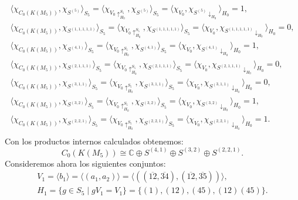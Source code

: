 \documentclass[12pt]{book}
\theoremstyle{definition}
\newcounter{in}
\begin{document}
\begin{eqnarray*}
  \langle\chi_{C_{0}(K(M_{5}))},\chi_{S^{(5)}}\rangle_{S_{5}}=\langle\chi_{V_{0}\uparrow^{S_{5}}_{H_0}},\chi_{S^{(5)}}\rangle_{S_{5}}=\langle\chi_{V_{0}},\chi_{S^{(5)}\downarrow_{H_{0}}}\rangle_{H_{0}}=1,\\
 \langle\chi_{C_{0}(K(M_{5}))},\chi_{S^{(1,1,1,1,1)}}\rangle_{S_{5}}=\langle\chi_{V_{0}\uparrow^{S_{5}}_{H_0}},\chi_{S^{(1,1,1,1,1)}}\rangle_{S_{5}}=\langle\chi_{V_{0}},\chi_{S^{(1,1,1,1,1)}\downarrow_{H_{0}}}\rangle_{H_{0}}=0,\\
\langle\chi_{C_{0}(K(M_{5}))},\chi_{S^{(4,1)}}\rangle_{S_{5}}=\langle\chi_{V_{0}\uparrow^{S_{5}}_{H_0}},\chi_{S^{(4,1)}}\rangle_{S_{5}}=\langle\chi_{V_{0}},\chi_{S^{(4,1)}\downarrow_{H_{0}}}\rangle_{H_{0}}=1,\\
\langle\chi_{C_{0}(K(M_{5}))},\chi_{S^{(2,1,1,1)}}\rangle_{S_{5}}=\langle\chi_{V_{0}\uparrow^{S_{5}}_{H_0}},\chi_{S^{(2,1,1,1)}}\rangle_{S_{5}}=\langle\chi_{V_{0}},\chi_{S^{(2,1,1,1)}\downarrow_{H_{0}}}\rangle_{H_{0}}=0,\\
\langle\chi_{C_{0}(K(M_{5}))},\chi_{S^{(3,1,1)}}\rangle_{S_{5}}=\langle\chi_{V_{0}\uparrow^{S_{5}}_{H_0}},\chi_{S^{(3,1,1)}}\rangle_{S_{5}}=\langle\chi_{V_{0}},\chi_{S^{(3,1,1)}\downarrow_{H_{0}}}\rangle_{H_{0}}=0,\\
\langle\chi_{C_{0}(K(M_{5}))},\chi_{S^{(3,2)}}\rangle_{S_{5}}=\langle\chi_{V_{0}\uparrow^{S_{5}}_{H_0}},\chi_{S^{(3,2)}}\rangle_{S_{5}}=\langle\chi_{V_{0}},\chi_{S^{(3,2)}\downarrow_{H_{0}}}\rangle_{H_{0}}=1,\\
\langle\chi_{C_{0}(K(M_{5}))},\chi_{S^{(2,2,1)}}\rangle_{S_{5}}=\langle\chi_{V_{0}\uparrow^{S_{5}}_{H_0}},\chi_{S^{(2,2,1)}}\rangle_{S_{5}}=\langle\chi_{V_{0}},\chi_{S^{(2,2,1)}\downarrow_{H_{0}}}\rangle_{H_{0}}=1.\\
\end{eqnarray*}
Con los productos internos calculados obtenemos:
\begin{equation}
  C_{0}(K(M_{5}))\cong \mathbb{C}\oplus S^{(4,1)}\oplus
  S^{(3,2)}\oplus S^{(2,2,1)}.
  \label{C0-KM5}
\end{equation}
Consideremos ahora los siguientes conjuntos:
\begin{eqnarray*}
V_{1}=\langle b_{1}\rangle=\langle (a_{1},a_{2})\rangle=\langle((\overline{12},\overline{34}),(\overline{12},\overline{35}))\rangle,\\
H_{1}=\{g\in S_{5}\mid gV_{1}=V_{1}\}=\{(1),(12),(45),(12)(45)\}.
\end{eqnarray*}
\end{document}

